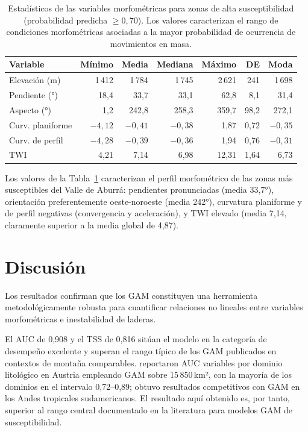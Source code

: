 \documentclass[12pt,a4paper]{article}
\begin{document}
\begin{table}[htbp]
\centering
\caption{Estadísticos de las variables morfométricas para zonas de
alta susceptibilidad (probabilidad predicha $\geq 0{,}70$). Los valores
caracterizan el rango de condiciones morfométricas asociadas a la
mayor probabilidad de ocurrencia de movimientos en masa.}
\label{tab:high_susc}
\small
\begin{tabular}{lrrrrrr}
\toprule
Variable & Mínimo & Media & Mediana & Máximo & DE & Moda \\
\midrule
Elevación (m)     & 1\,412 & 1\,784 & 1\,745 & 2\,621 & 241 & 1\,698 \\
Pendiente (°)     & 18{,}4 & 33{,}7 & 33{,}1 & 62{,}8 &  8{,}1 & 31{,}4 \\
Aspecto (°)       & 1{,}2  & 242{,}8 & 258{,}3 & 359{,}7 & 98{,}2 & 272{,}1 \\
Curv. planiforme  & $-4{,}12$ & $-0{,}41$ & $-0{,}38$ & 1{,}87 & 0{,}72 & $-0{,}35$ \\
Curv. de perfil   & $-4{,}28$ & $-0{,}39$ & $-0{,}36$ & 1{,}94 & 0{,}76 & $-0{,}31$ \\
TWI               & 4{,}21 & 7{,}14 & 6{,}98 & 12{,}31 & 1{,}64 & 6{,}73 \\
\bottomrule
\end{tabular}
\end{table}

Los valores de la Tabla~\ref{tab:high_susc} caracterizan el perfil
morfométrico de las zonas más susceptibles del Valle de Aburrá:
pendientes pronunciadas (media 33{,}7°), orientación preferentemente
oeste-noroeste (media 242°), curvatura planiforme y de perfil
negativas (convergencia y aceleración), y TWI elevado (media 7{,}14,
claramente superior a la media global de 4{,}87).

\section{Discusión}

Los resultados confirman que los GAM constituyen una herramienta metodológicamente robusta para cuantificar relaciones no lineales entre variables morfométricas e inestabilidad de laderas. 

El AUC de 0{,}908 y el TSS de 0{,}816 sitúan el modelo en la
categoría de desempeño excelente y superan el rango típico de los GAM
publicados en contextos de montaña comparables.
\citet{petschko2014} reportaron AUC variables por dominio litológico
en Austria empleando GAM sobre 15\,850\,km², con la mayoría de los
dominios en el intervalo 0{,}72--0{,}89;
\citet{brenning2008statistical} obtuvo resultados competitivos con GAM
en los Andes tropicales sudamericanos.
El resultado aquí obtenido es, por tanto, superior al rango central
documentado en la literatura para modelos GAM de susceptibilidad.
\end{document}
